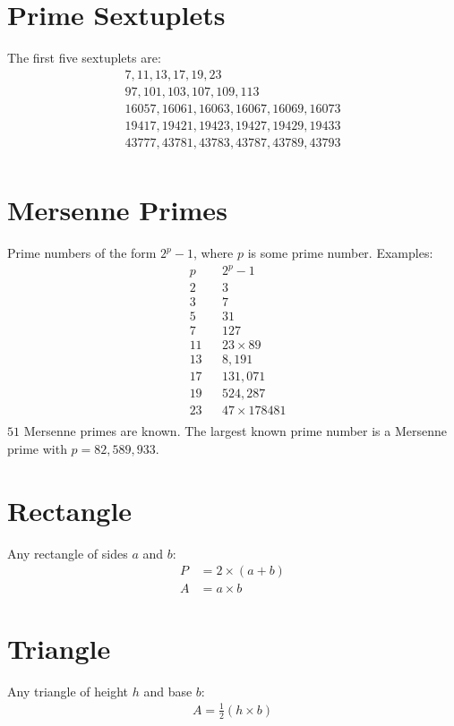 \documentclass[12pt]{article}
\begin{document}
\section*{Prime Sextuplets}
The first five sextuplets are: 
\begin{align*}
7, 11, 13, 17, 19, 23\\
97, 101, 103, 107, 109, 113\\
16057, 16061, 16063, 16067, 16069, 16073\\
19417, 19421, 19423, 19427, 19429, 19433\\
43777, 43781, 43783, 43787, 43789, 43793\\
\end{align*}



\section*{Mersenne Primes}
Prime numbers of the form $2^{p}-1$, where $p$ is some prime number. Examples:
\begin{align*}
&  p && 2^{p}-1\\
&  2 && 3\\
&  3 && 7\\
&  5 && 31\\
&  7 && 127\\
& 11 && 23 \times 89\\
& 13 && 8,191\\
& 17 && 131,071 \\
& 19 && 524,287 \\
& 23 && 47 \times 178481 \\
\end{align*}
$51$ Mersenne primes are known. The largest known prime number is a Mersenne prime with $p=82,589,933$. 


\newpage
\section*{Rectangle}
Any rectangle of sides $a$ and $b$:
\begin{align*}
P & = 2 \times (a + b)\\
A & = a \times b
\end{align*}

\section*{Triangle}
Any triangle of height $h$ and base $b$:
\begin{align*}
A = \frac{1}{2} (h \times b)
\end{align*}
\end{document}
